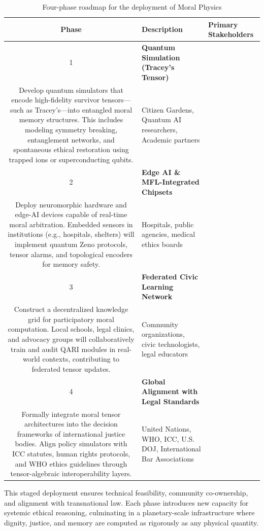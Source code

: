 \documentclass[12]{amsart}
\theoremstyle{plain}
\begin{document}
\begin{table}[h]
\centering
\begin{tabular}{|c|p{7cm}|p{5cm}|}
\hline
\textbf{Phase} & \textbf{Description} & \textbf{Primary Stakeholders} \\
\hline
1 & \textbf{Quantum Simulation (Tracey’s Tensor)}\\
Develop quantum simulators that encode high-fidelity survivor tensors—such as Tracey’s—into entangled moral memory structures. This includes modeling symmetry breaking, entanglement networks, and spontaneous ethical restoration using trapped ions or superconducting qubits. & Citizen Gardens, Quantum AI researchers, Academic partners \\
\hline
2 & \textbf{Edge AI \& MFL-Integrated Chipsets} \\
Deploy neuromorphic hardware and edge-AI devices capable of real-time moral arbitration. Embedded sensors in institutions (e.g., hospitals, shelters) will implement quantum Zeno protocols, tensor alarms, and topological encoders for memory safety. & Hospitals, public agencies, medical ethics boards \\
\hline
3 & \textbf{Federated Civic Learning Network} \\
Construct a decentralized knowledge grid for participatory moral computation. Local schools, legal clinics, and advocacy groups will collaboratively train and audit QARI modules in real-world contexts, contributing to federated tensor updates. & Community organizations, civic technologists, legal educators \\
\hline
4 & \textbf{Global Alignment with Legal Standards} \\
Formally integrate moral tensor architectures into the decision frameworks of international justice bodies. Align policy simulators with ICC statutes, human rights protocols, and WHO ethics guidelines through tensor-algebraic interoperability layers. & United Nations, WHO, ICC, U.S. DOJ, International Bar Associations \\
\hline
\end{tabular}
\caption{Four-phase roadmap for the deployment of Moral Physics}
\end{table}

This staged deployment ensures technical feasibility, community co-ownership, and alignment with transnational law. Each phase introduces new capacity for systemic ethical reasoning, culminating in a planetary-scale infrastructure where dignity, justice, and memory are computed as rigorously as any physical quantity.
\end{document}

